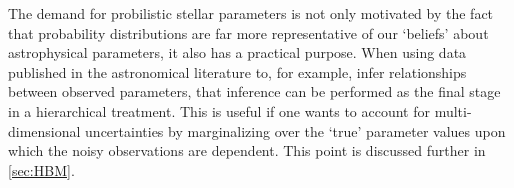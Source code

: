 The demand for probilistic stellar parameters is not only motivated by the fact
that probability distributions are far more representative of our `beliefs'
about astrophysical parameters, it also has a practical purpose.
When using data published in the astronomical literature to, for example, infer
relationships between observed parameters, that inference can be performed as
the final stage in a hierarchical treatment.
This is useful if one wants to account for multi-dimensional uncertainties by
marginalizing over the `true' parameter values upon which the noisy
observations are dependent.
This point is discussed further in \textsection\ref{sec:HBM}.

